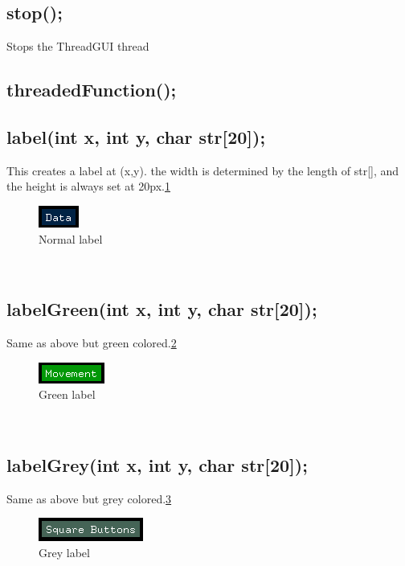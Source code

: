 \documentclass{article}
\begin{document}
\subsection{stop();}
Stops the ThreadGUI thread
\subsection{threadedFunction();}

\subsection{label(int x, int y, char str[20]);}
This creates a label at (x,y). the width is determined by the length of str[], and the height is always set at 20px.\ref{label}\\
\begin{figure}[htp]
  \begin{center}
\includegraphics[]{label}
  \end{center}
  \caption{Normal label}
\label{label}
\end{figure}\\

\subsection{labelGreen(int x, int y, char str[20]);}
Same as above but green colored.\ref{labelgreen}\\
\begin{figure}[htp]
  \begin{center}
\includegraphics[]{labelgreen}
  \end{center}
  \caption{Green label}
\label{labelgreen}
\end{figure}\\

\subsection{labelGrey(int x, int y, char str[20]);}
Same as above but grey colored.\ref{labelgrey}\\
\begin{figure}[htp]
  \begin{center}
\includegraphics[]{labelgrey}
  \end{center}
  \caption{Grey label}
\label{labelgrey}
\end{figure}\\
\end{document}
